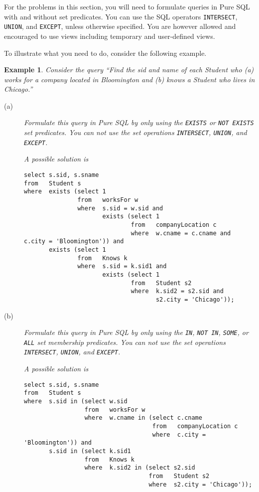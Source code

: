 \documentclass[11pt]{article}
\newtheorem{example}{Example}
\begin{document}
For the problems in this section, you will need to formulate queries in {Pure SQL} with and without set predicates.
You can use the SQL operators {\tt INTERSECT}, {\tt UNION}, and {\tt EXCEPT}, unless otherwise specified.
You are however allowed and  encouraged to use views including temporary and user-defined views.

To illustrate what you need to do, consider the following example.
\begin{example}\label{PureSQLquery}
Consider the query ``\emph{Find the sid and name of each Student who (a)
works for a company located in Bloomington  and (b)
knows a Student who lives in Chicago.}''

\begin{description}
\item[(a)]   Formulate this query in Pure SQL by only using the {\tt EXISTS} or {\tt NOT EXISTS} set predicates.
You can not use the set operations {\tt INTERSECT}, {\tt UNION}, and {\tt EXCEPT}.

A possible solution is
{\footnotesize
\begin{verbatim}
select s.sid, s.sname
from   Student s
where  exists (select 1
               from   worksFor w
               where  s.sid = w.sid and
                      exists (select 1
                              from   companyLocation c
                              where  w.cname = c.cname and c.city = 'Bloomington')) and
       exists (select 1
               from   Knows k
               where  s.sid = k.sid1 and
                      exists (select 1
                              from   Student s2
                              where  k.sid2 = s2.sid and
                                     s2.city = 'Chicago'));
\end{verbatim}
}

\item[(b)]   Formulate this query in Pure SQL by only using the {\tt  IN}, {\tt NOT IN}, {\tt SOME}, or {\tt ALL} set membership predicates.
You can not use the set operations {\tt INTERSECT}, {\tt UNION}, and {\tt EXCEPT}.

A possible solution is
{\footnotesize
\begin{verbatim}
select s.sid, s.sname
from   Student s
where  s.sid in (select w.sid
                 from   worksFor w
                 where  w.cname in (select c.cname
                                    from   companyLocation c
                                    where  c.city = 'Bloomington')) and
       s.sid in (select k.sid1
                 from   Knows k
                 where  k.sid2 in (select s2.sid
                                   from   Student s2
                                   where  s2.city = 'Chicago'));
\end{verbatim}
}


\end{description}
\end{example}
\end{document}
